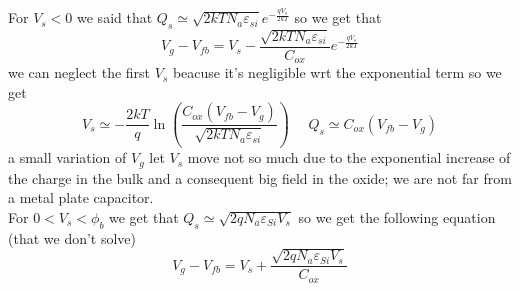 \vspace{5mm}
For $V_s<0$ we said that  $Q_s\simeq \sqrt{2kTN_a\varepsilon_{si}}e^{-\frac{qV_s}{2kT}}$ so we get that
\begin{equation}
V_g-V_{fb}=V_s-\frac{\sqrt{2kTN_a\varepsilon_{si}}}{C_{ox}}e^{-\frac{qV_s}{2kT}}
\end{equation} 
we can neglect the first $V_s$ beacuse it's negligible wrt the exponential term so we get 
\begin{equation}
V_s\simeq-\frac{2kT}{q}\ln\left(\frac{C_{ox}(V_{fb}-V_g)}{\sqrt{2kTN_a\varepsilon_{si}}} \right) \ \ \ \ \ \ Q_s\simeq C_{ox}(V_{fb}-V_g)
\end{equation}
a small variation of $V_g$ let $V_s$ move not so much due to the exponential increase of the charge in the bulk and a consequent big field in the oxide; we are not far from a metal plate capacitor.\\

\vspace{5mm}
For $0<V_s<\phi_b$ we get that $Q_s\simeq \sqrt{2qN_a\varepsilon_{Si}V_s}$ so we get the following equation (that we don't solve)
\begin{equation}
V_g-V_{fb}=V_s+\frac{\sqrt{2qN_a\varepsilon_{Si}V_s}}{C_{ox}}
\end{equation}

\vspace{5mm}

{\begin{center} 
\end{center}}



